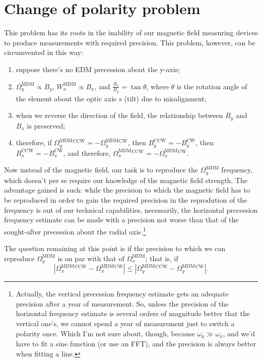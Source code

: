 \documentclass{article}
\newcommand{\W}{\Omega}
\newcommand{\w}{\omega}
\newcommand{\MDM}{^\mathrm{MDM}}
\newcommand{\CW}{^\mathrm{CW}}
\newcommand{\CCW}{^\mathrm{CCW}}
\begin{document}
\section{Change of polarity problem}
This problem has its roots in the inability of our magnetic field measuring devices to produce measurements with required precision. This problem, however, can be circumvented in this way:
\begin{enumerate}
\item suppose there's no EDM precession about the y-axis;
\item $\W_y\MDM\propto B_y$, $W_x\MDM\propto B_x$, and $\frac{B_x}{B_y} = \tan\theta$, where $\theta$ is the rotation angle of the element about the optic axis $s$ (tilt) due to misalignment;
\item when we reverse the direction of the field, the relationship between $B_y$ and $B_x$ is preserved;
\item therefore, if $\W_y\MDM\CCW = -\W_y\MDM\CW$, then $B_y\CCW = -B_y\CW$, then $B_x\CCW = -B_x\CW$, and therefore, $\W_x\MDM\CCW = -\W_x\MDM\CW$.
\end{enumerate}

Now instead of the magnetic field, our task is to reproduce the $\W_y\MDM$ frequency, which doesn't per se require our knowledge of the magnetic field strength. The advantage gained is such: while the precision to which the magnetic field has to be reproduced in order to gain the required precision in the reprodution of the frequency is out of our technical capabilities, necessarily, the horizontal precession frequency estimate can be made with a precision not worse than that of the sought-after precession about the radial axis.\footnote{Actually, the vertical precession frequency estimate gets an adequate precision after a year of measurement. So, unless the precision of the horizontal frequency estimate is several orders of magnitude better that the vertical one's, we cannot spend a year of measurement just to switch a polarity once. Which I'm not sure about, though, because $\w_y \gg \w_x$, and we'd have to fit a sine function (or use an FFT), and the precision is always better when fitting a line.}

The question remaining at this point is if the precision to which we can reproduce $\W_y\MDM$ is on par with that of $\W_x\MDM$; that is, if
\begin{equation}\label{eq:calibration_condition}
  |\W_x\MDM\CCW - \W_x\MDM\CW| \leq |\W_y\MDM\CCW - \W_y\MDM\CW|.
\end{equation}
\end{document}
